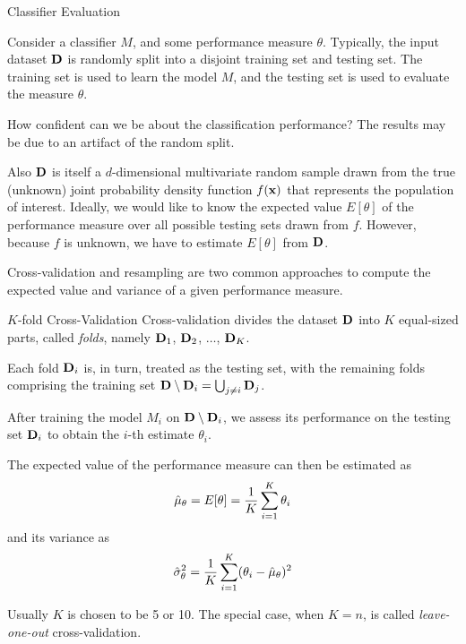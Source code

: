 \begin{frame}{Classif\/{i}er Evaluation}

  Consider a 
classif\/{i}er $M$, and some performance measure $\theta$. 
Typically,
the input dataset $\mathbf{D}$ is randomly split into a disjoint training
set and testing set. The training set is used to learn the model
$M$, and the testing set is used to evaluate the measure $\theta$.


\medskip
How conf\/{i}dent can we be about the classif\/{i}cation
performance? The results may be due to an artifact of the random
split. 

\medskip
Also $\mathbf{D}$ is
itself a $d$-dimensional multivariate random sample drawn from the
true (unknown) joint probability density function $f(\mathbf{x})$ that
represents the population of interest.  Ideally, we would like to
know the expected value $E[\theta]$ of the performance measure
over all possible testing sets drawn from $f$. However, because
$f$ is unknown, we have to estimate $E[\theta]$ from $\mathbf{D}$.

\medskip
Cross-validation and resampling are two common approaches
to compute the expected value and variance of a given performance
measure.
\end{frame}



\begin{frame}{$K$-fold Cross-Validation}
Cross-validation divides the dataset $\mathbf{D}$
into $K$ equal-sized parts, called {\em folds}, namely $\mathbf{D}_1$, $\mathbf{D}_2$,
$\ldots$, $\mathbf{D}_K$.

\medskip
Each fold $\mathbf{D}_i$ is, in turn, treated as the testing set, with
the remaining folds comprising the training set
$\mathbf{D}\setminus\mathbf{D}_i = \bigcup_{j \ne i} \mathbf{D}_{j}$.

\medskip
After training the model $M_i$ on $\mathbf{D}\setminus\mathbf{D}_i$, we assess its performance
on the testing set $\mathbf{D}_i$ to obtain the $i$-th estimate $\theta_i$.

\medskip
The expected value of the performance measure can then be estimated as
\begin{align*}
  \hat{\mu}_\theta = E[\theta] = {1\over K} \sum_{i=1}^K \theta_i
\end{align*}
and its variance as
\begin{align*}
  \hat{\sigma}^2_\theta  = {1\over K} \sum_{i=1}^K (\theta_i - \hat{\mu}_\theta)^2
\end{align*}

\medskip
Usually $K$ is chosen to be 5 or 10. The special case, when $K=n$, is
called {\em leave-one-out}
cross-validation.
\end{frame}


